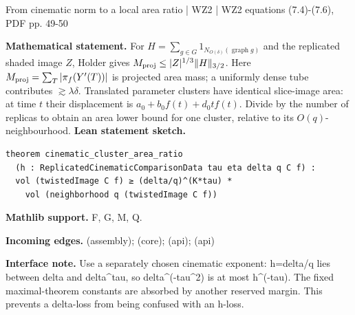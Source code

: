 \documentclass[10pt,a4paper]{article}
\newcommand{\nodecard}[1]{\hyperlink{node-#1}{\texttt{\detokenize{#1}}}}
\begin{document}
\begin{minipage}{\linewidth}
\hypertarget{node-W2AreaCompare}{}
\begin{tcolorbox}[colback=white,colframe=cinematicfg,colbacktitle=cinematicbg,coltitle=ink,boxrule=0.45pt,arc=1.6mm,left=3mm,right=3mm,top=2mm,bottom=2mm,title={\sffamily\bfseries WZ2 Lemma 7.12: Holder and translations \hfill \texttt{W2AreaCompare}}]
{\sffamily\small\color{muted}From cinematic norm to a local area ratio | WZ2 | WZ2 equations (7.4)-(7.6), PDF pp. 49-50}\par
\textbf{Mathematical statement.} For $H=\sum_{g\in G}1_{N_{O(\delta)}(\operatorname{graph}g)}$ and the replicated shaded image $Z$, Holder gives
$M_{\rm proj}\le |Z|^{1/3}\|H\|_{3/2}$.
Here $M_{\rm proj}=\sum_T|\pi_f(Y'(T))|$ is projected area mass; a uniformly dense tube contributes $\gtrsim\lambda\delta$.
Translated parameter clusters have identical slice-image area: at time $t$ their displacement is $a_0+b_0f(t)+d_0tf(t)$.
Divide by the number of replicas to obtain an area lower bound for one cluster, relative to its $O(q)$-neighbourhood.
\smallskip\textbf{Lean statement sketch.}
\begin{Verbatim}[fontsize=\small,breaklines=true,breakanywhere=true,tabsize=2]
theorem cinematic_cluster_area_ratio
  (h : ReplicatedCinematicComparisonData tau eta delta q C f) :
  vol (twistedImage C f) ≥ (delta/q)^(K*tau) *
    vol (neighborhood q (twistedImage C f))
\end{Verbatim}
{\footnotesize\textbf{Mathlib support.} F, G, M, Q.\par
\textbf{Incoming edges.} \nodecard{W2JetCount} (assembly); \nodecard{T7_2} (core); \nodecard{Imass} (api); \nodecard{Iparams} (api)\par}
{\footnotesize\textbf{Interface note.} Use a separately chosen cinematic exponent: h=delta/q lies between delta and delta\textasciicircum{}tau, so delta\textasciicircum{}(-tau\textasciicircum{}2) is at most h\textasciicircum{}(-tau). The fixed maximal-theorem constants are absorbed by another reserved margin. This prevents a delta-loss from being confused with an h-loss.}
\end{tcolorbox}\end{minipage}\par\medskip
\end{document}
